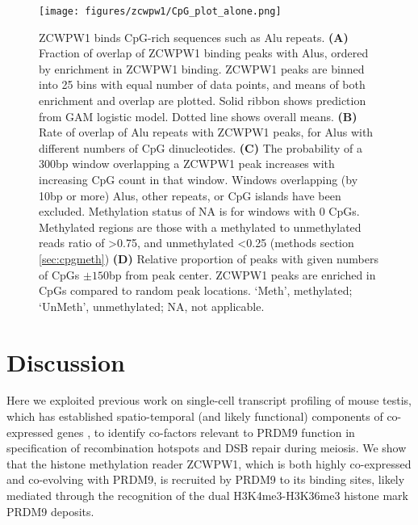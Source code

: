 \begin{figure}[H]
	\centering
	\texttt{[image: figures/zcwpw1/CpG\_plot\_alone.png]}
	\caption[ZCWPW1 binds CpG rich sequences]{
		ZCWPW1 binds CpG-rich sequences such as Alu repeats.
		\textbf{(A)} Fraction of overlap of ZCWPW1 binding peaks with Alus, ordered by enrichment in ZCWPW1 binding.
			ZCWPW1 peaks are binned into 25 bins with equal number of data points, and means of both enrichment and overlap are plotted.
			Solid ribbon shows prediction from GAM logistic model.
			Dotted line shows overall means.
		\textbf{(B)} Rate of overlap of Alu repeats with ZCWPW1 peaks, for Alus with different numbers of CpG dinucleotides.
		\textbf{(C)} The probability of a 300bp window overlapping a ZCWPW1 peak increases with increasing CpG count in that window.
			Windows overlapping (by 10bp or more) Alus, other repeats, or CpG islands have been excluded.
			Methylation status of NA is for windows with 0 CpGs.
			Methylated regions are those with a methylated to unmethylated reads ratio of >0.75, and unmethylated <0.25 (methods section \ref{sec:cpgmeth})
		\textbf{(D)} Relative proportion of peaks with given numbers of CpGs $\pm150$bp from peak center.
			ZCWPW1 peaks are enriched in CpGs compared to random peak locations.
			‘Meth’, methylated; ‘UnMeth’, unmethylated; NA, not applicable.
	}
	\label{fig:CpG}
\end{figure}


\section{Discussion}
Here we exploited previous work on single-cell transcript profiling of mouse testis, which has established spatio-temporal (and likely functional) components of co-expressed genes \parencite{Jung2019Unified}, to identify co-factors relevant to PRDM9 function in specification of recombination hotspots and DSB repair during meiosis.
We show that the histone methylation reader ZCWPW1, which is both highly co-expressed and co-evolving with PRDM9, is recruited by PRDM9 to its binding sites, likely mediated through the recognition of the dual H3K4me3-H3K36me3 histone mark PRDM9 deposits.

